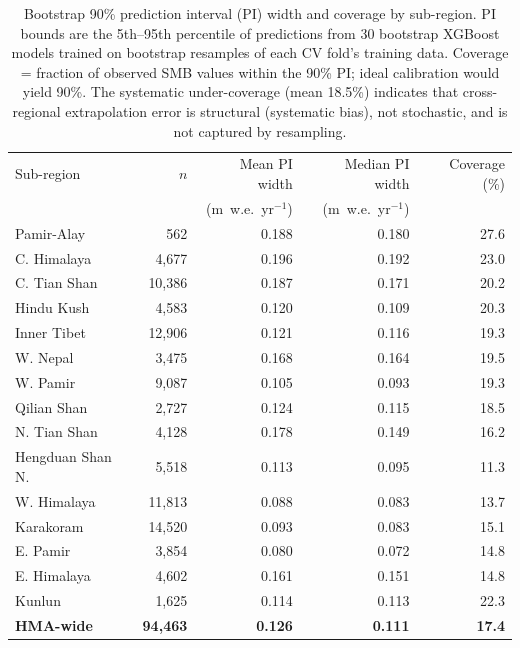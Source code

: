 \begin{table}[htbp]
\centering
\caption{Bootstrap 90\% prediction interval (PI) width and coverage by sub-region.
PI bounds are the 5th--95th percentile of predictions from 30 bootstrap XGBoost models
trained on bootstrap resamples of each CV fold's training data. Coverage = fraction of
observed SMB values within the 90\% PI; ideal calibration would yield 90\%.
The systematic under-coverage (mean 18.5\%) indicates that cross-regional extrapolation
error is structural (systematic bias), not stochastic, and is not captured by resampling.}
\label{tab:bootstrap_pi_sub}
\small
\begin{tabular}{lrrrr}
\hline
Sub-region & $n$ & Mean PI width & Median PI width & Coverage (\%) \\
           &     & (m~w.e.~yr$^{-1}$) & (m~w.e.~yr$^{-1}$) & \\
\hline
Pamir-Alay       &    562 & 0.188 & 0.180 & 27.6 \\
C. Himalaya      &  4,677 & 0.196 & 0.192 & 23.0 \\
C. Tian Shan     & 10,386 & 0.187 & 0.171 & 20.2 \\
Hindu Kush       &  4,583 & 0.120 & 0.109 & 20.3 \\
Inner Tibet      & 12,906 & 0.121 & 0.116 & 19.3 \\
W. Nepal         &  3,475 & 0.168 & 0.164 & 19.5 \\
W. Pamir         &  9,087 & 0.105 & 0.093 & 19.3 \\
Qilian Shan      &  2,727 & 0.124 & 0.115 & 18.5 \\
N. Tian Shan     &  4,128 & 0.178 & 0.149 & 16.2 \\
Hengduan Shan N. &  5,518 & 0.113 & 0.095 & 11.3 \\
W. Himalaya      & 11,813 & 0.088 & 0.083 & 13.7 \\
Karakoram        & 14,520 & 0.093 & 0.083 & 15.1 \\
E. Pamir         &  3,854 & 0.080 & 0.072 & 14.8 \\
E. Himalaya      &  4,602 & 0.161 & 0.151 & 14.8 \\
Kunlun           &  1,625 & 0.114 & 0.113 & 22.3 \\
\hline
\textbf{HMA-wide} & \textbf{94,463} & \textbf{0.126} & \textbf{0.111} & \textbf{17.4} \\
\hline
\end{tabular}
\end{table}
